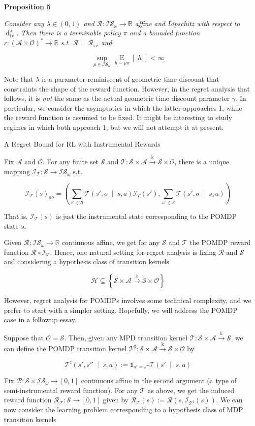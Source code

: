 \documentclass[a4paper]{article}
\newcommand{\Co}[1]{}
\newcommand{\AP}[1]{\left(#1\right)}
\newcommand{\AB}[1]{\left[#1\right]}
\newcommand{\AC}[1]{\left\{#1\right\}}
\newcommand{\APM}[2]{\left(#1\;\middle\vert\;#2\right)}
\newcommand{\Abs}[1]{\left\vert #1 \right\vert}
\newcommand{\Ea}[2]{\underset{#1}{\operatorname{E}}\AB{#2}}
\newcommand{\Dtv}{\operatorname{d}_{\text{tv}}}
\newcommand{\Reals}{\mathbb{R}}
\newcommand{\K}{\xrightarrow{\mathrm{k}}}
\newcommand{\KD}[1]{\boldsymbol{1}_{#1}}
\newcommand{\St}{\mathcal{S}}
\newcommand{\A}{\mathcal{A}}
\newcommand{\Ob}{\mathcal{O}}
\newcommand{\AO}{\AP{\A\times\Ob}}
\newcommand{\FH}{\AO^*}
\newcommand{\R}{\mathcal{R}}
\newcommand{\T}{\mathcal{T}}
\newcommand{\Hy}{\mathcal{H}}
\newcommand{\In}{\mathcal{I}}
\newcommand{\IS}{\mathcal{IS}}
\begin{document}
\textbf{Proposition 5}\Co{b}

\textit{Consider any $\lambda\in(0,1)$ and $\R:\IS_\omega\rightarrow\Reals$ affine and Lipschitz with respect to $\Dtv^\lambda$. Then there is a terminable policy $\pi$ and a bounded function $r:\FH\rightarrow\Reals$ s.t. $\R=\R_{\pi r}$ and}\Co{i}

$$\sup_{\mu\in\IS_\omega}\Ea{h\sim\mu\pi}{\Abs{h}} < \infty$$

Note that $\lambda$ is a parameter reminiscent of geometric time discount that constraints the shape of the reward function. However, in the regret analysis that follows, it is \textit{not}\Co{i} the same as the actual geometric time discount parameter $\gamma$. In particular, we consider the asymptotics in which the latter approaches 1, while the reward function is assumed to be fixed. It might be interesting to study regimes in which both approach 1, but we will not attempt it at present.

\begin{Large}A Regret Bound for RL with Instrumental Rewards\end{Large}

Fix $\A$ and $\Ob$. For any finite set $\St$ and $\T:\St\times\A\K\St\times\Ob$, there is a unique mapping $\In_\T:\St\rightarrow\IS_{\omega}$ s.t. 

$$\In_\T(s)_{ao}=\AP{\sum_{s'\in\St}\T\APM{s',o}{s,a}\In_T\AP{s'},\sum_{s'\in\St}\T\APM{s',o}{s,a}}$$

That is, $\In_\T(s)$ is just the instrumental state corresponding to the POMDP state $s$.

Given $\R:\IS_\omega\rightarrow\Reals$ continuous affine, we get for any $\St$ and $\T$ the POMDP reward function $\R\circ\In_\T$. Hence, one natural setting for regret analysis is fixing $\R$ and $\St$ and considering a hypothesis class of transition kernels

$$\Hy\subseteq\AC{\St\times\A\K\St\times\Ob}$$

However, regret analysis for POMDPs involves some technical complexity, and we prefer to start with a simpler setting. Hopefully, we will address the POMDP case in a followup essay.

Suppose that $\Ob=\St$. Then, given any MPD transition kernel $\T:\St\times\A\K\St$, we can define the POMDP transition kernel $\T^\sharp:\St\times\A\K\St\times\Ob$ by

$$\T^\sharp\APM{s',s''}{s,a}:=\KD{s'=s''}\T\APM{s'}{s,a}$$

Fix $\R:\St\times\IS_\omega\rightarrow[0,1]$ continuous affine in the second argument (a type of semi-instrumental reward function). For any $\T$ as above, we get the induced reward function $\R_\T:\St\rightarrow[0,1]$ given by $\R_\T(s):=\R\AP{s,\In_{\T^\sharp}(s)}$. We can now consider the learning problem corresponding to a hypothesis class of MDP transition kernels
\end{document}

